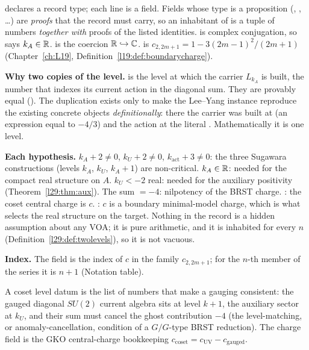 \begin{dictionary}
 declares a record type; each line  is a field. Fields whose type is a
proposition (, , \dots) are \emph{proofs} that the record must carry, so an
inhabitant of  is a tuple of numbers \emph{together with} proofs of the listed identities.
 is complex conjugation, so  says $k_A\in\mathbb{R}$.  is the coercion
$\mathbb{R}\hookrightarrow{\mathbb{C}}$.  is $c_{2,2m+1}=1-3(2m-1)^2/(2m+1)$ (Chapter~\ref{ch:L19},
Definition~\ref{l19:def:boundarycharge}).

\textbf{Why two copies of the level.}  is the level at which the carrier $L_{k_A}$ is built, 
the number that indexes its current action in the diagonal sum. They are provably equal (). The
duplication exists only to make the Lee--Yang instance reproduce the existing concrete objects \emph{definitionally}:
there the carrier was built at  (an expression equal to $-4/3$) and the action at the literal
. Mathematically it is one level.

\textbf{Each hypothesis.} $k_A+2\ne0$, $k_U+2\ne0$, $k_{\mathrm{act}}+3\ne0$: the three Sugawara constructions
(levels $k_A$, $k_U$, $k_A+1$) are non-critical. $k_A\in\mathbb{R}$: needed for the compact real structure on $A$.
$k_U<-2$ real: needed for the auxiliary positivity (Theorem~\ref{l29:thm:aux}). The sum $=-4$: nilpotency of the BRST
charge. : the coset central charge is $c$. : $c$ is a boundary minimal-model charge, which
is what selects the real structure on the target. Nothing in the record is a hidden assumption about any VOA; it is
pure arithmetic, and it is inhabited for every $n$ (Definition~\ref{l29:def:twolevels}), so it is not vacuous.

\textbf{Index.} The field  is the index of $c$ in the family $c_{2,2m+1}$; for the $n$-th member of the series
it is $n+1$ (Notation table).
\end{dictionary}

\begin{physics}
A coset level datum is the list of numbers that make a gauging consistent: the gauged diagonal $SU(2)$ current
algebra sits at level $k+1$, the auxiliary sector at $k_U$, and their sum must cancel the ghost contribution $-4$
(the level-matching, or anomaly-cancellation, condition of a $G/G$-type BRST reduction). The charge field is the GKO
central-charge bookkeeping $c_{\mathrm{coset}}=c_{\mathrm{UV}}-c_{\mathrm{gauged}}$.
\end{physics}

